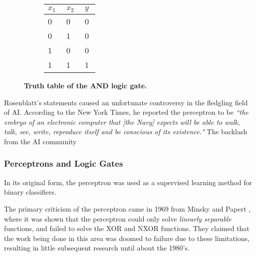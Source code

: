 \begin{figure}[!htp]
    \centering
    \begin{subfigure}[b]{0.70\textwidth}
        \centering
        
        \captionsetup{format=hang} %
        \label{fig:perceptron:and:mapping}
    \end{subfigure}\hfil
    \begin{subfigure}[b]{0.29\textwidth}
        \centering
        \renewcommand{\arraystretch}{1.5}
        \begin{tabular}{C{0.1\linewidth}C{0.1\linewidth}|C{0.1\linewidth}}
            \hline
            $x_1$ & $x_2$ & $y$ \\      & 0     & 0   \\
            0     & 1     & 0   \\
            1     & 0     & 0   \\
            1     & 1     & 1
        \end{tabular}
        \vspace{0.5cm}
        \label{fig:perceptron:and:truth}
    \end{subfigure}\hfil
    \captionsetup{format=hang} %
    \caption{
        \textbf{Truth table of the AND logic gate.}
    }
    \label{fig:perceptron:and}
\end{figure}



Rosenblatt's statements caused an unfortunate controversy in the fledgling field
of \gls{AI}. According to the New York Times, he reported the perceptron to be
\textit{``the embryo of an electronic computer that [the Navy] expects will be
able to walk, talk, see, write, reproduce itself and be conscious of its
existence."} \cite{Olazaran1996} The backlash from the \gls{AI} community

\subsubsection{Perceptrons and Logic Gates}




In its original form, the perceptron was used as a supervised learning method
for binary classifiers.

The primary criticism of the perceptron came in 1969 from Minsky and Papert
\cite{minsky69perceptrons}, where it was shown that the perceptron could only
solve \textit{linearly separable} functions, and failed to solve the XOR and
NXOR functions. They claimed that the work being done in this area was doomed to
failure due to these limitations, resulting in little subsequent research until
about the 1980's.


